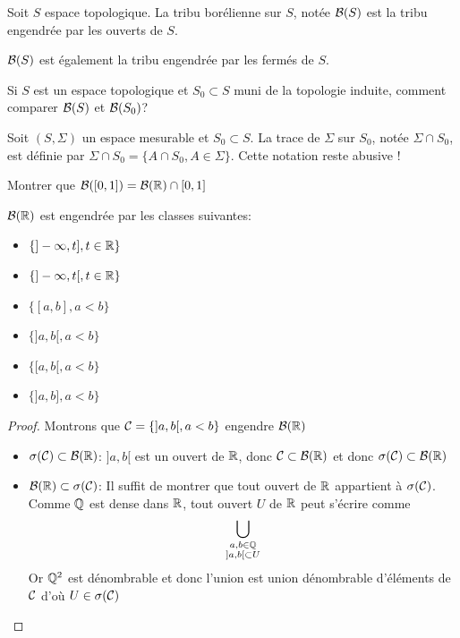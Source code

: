 \documentclass[]{report}
\begin{document}
    \begin{df}{}{}
        Soit $S$ espace topologique. La tribu borélienne sur $S$, notée $\mathcal{B}(S)$ est la tribu engendrée par les ouverts de $S$.
    \end{df}

    \begin{re}{}{}
        $\mathcal{B}(S)$ est également la tribu engendrée par les fermés de $S$.
    \end{re}

    \begin{qs*}{}{}
        Si $S$ est un espace topologique et $S_0\subset S$ muni de la topologie induite, comment comparer $\mathcal{B}(S)$ et $\mathcal{B}(S_0)$?
    \end{qs*}

    \begin{df}{}{}
        Soit $(S,\Sigma)$ un espace mesurable et $S_0\subset S$. La trace de $\Sigma$ sur $S_0$, notée $\Sigma\cap S_0$, est définie par $\Sigma\cap S_0=\{A\cap S_0,A\in\Sigma\}$. Cette notation reste abusive !
    \end{df}

    \begin{exo}{}{}
        Montrer que $\mathcal{B}([0,1])=\mathcal{B}(\mathbb{R})\cap[0,1]$
    \end{exo}

    \begin{prop}{}{}
        $\mathcal{B}(\mathbb{R})$ est engendrée par les classes suivantes:
        \begin{itemize}
            \item $\{]-\infty,t],t\in\mathbb{R}\}$
            \item $\{]-\infty,t[,t\in\mathbb{R}\}$
            \item $\{[a,b],a<b\}$
            \item $\{]a,b[,a<b\}$
            \item $\{[a,b[,a<b\}$
            \item $\{]a,b],a<b\}$
        \end{itemize}
    \end{prop}

    \begin{proof}
        Montrons que $\mathcal{C}=\{]a,b[,a<b\}$ engendre $\mathcal{B}(\mathbb{R})$
        \begin{itemize}
            \item $\sigma(\mathcal{C})\subset\mathcal{B}(\mathbb{R})$: $]a,b[$ est un ouvert de $\mathbb{R}$, donc $\mathcal{C}\subset\mathcal{B}(\mathbb{R})$ et donc $\sigma(\mathcal{C})\subset\mathcal{B}(\mathbb{R})$
            \item $\mathcal{B}(\mathbb{R})\subset \sigma(\mathcal{C})$: Il suffit de montrer que tout ouvert de $\mathbb{R}$ appartient à $\sigma(\mathcal{C})$. Comme $\mathbb{Q}$ est dense dans $\mathbb{R}$, tout ouvert $U$ de $\mathbb{R}$ peut s'écrire comme
            \[\bigcup_{\substack{a,b\in\mathbb{Q}\\]a,b[\subset U}}\]
            Or $\mathbb{Q}^2$ est dénombrable et donc l'union est union dénombrable d'éléments de $\mathcal{C}$ d'où $U\in\sigma(\mathcal{C})$
        \end{itemize}
    \end{proof}
\end{document}
